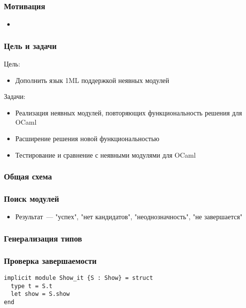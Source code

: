 \documentclass{beamer}
\begin{document}
\begin{frame}\frametitle{Мотивация}
\begin{itemize}
  \item 
\end{itemize}
\end{frame}

\begin{frame}\frametitle{Цель и задачи}
Цель:
\begin{itemize}
  \item Дополнить язык 1ML поддержкой неявных модулей
\end{itemize}
Задачи:
\begin{itemize}
  \item Реализация неявных модулей, повторяющих функциональность решения для OCaml
  \item Расширение решения новой функциональностью
  \item Тестирование и сравнение с неявными модулями для OCaml
\end{itemize}
\end{frame}

\begin{frame}\frametitle{Общая схема}
  
\end{frame}

\begin{frame}\frametitle{Поиск модулей}
\begin{itemize}
  \item Результат~--- "успех", "нет кандидатов", "неоднозначность", "не завершается"
\end{itemize}
\end{frame}

\begin{frame}\frametitle{Генерализация типов}

\end{frame}

\lstset{language=caml}
\begin{frame}[fragile]\frametitle{Проверка завершаемости}
\begin{lstlisting}
implicit module Show_it {S : Show} = struct
  type t = S.t
  let show = S.show
end
\end{lstlisting}

\end{frame}
\end{document}
